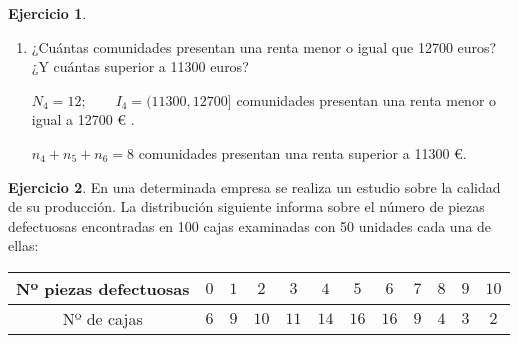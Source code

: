 \documentclass[a4paper, 12pt]{article}
\theoremstyle{definition}
\newtheorem{ej}{Ejercicio}
\begin{document}
\begin{ej}
\begin{enumerate}[label=\textit{\alph*)}]
    \item ¿Cuántas comunidades presentan una renta menor o igual que 12700 euros? ¿Y cuántas superior a 11300 euros?
    
    \(N_4 = 12 ; \qquad I_4 = (11300,12700] \)  comunidades presentan una renta menor o igual a 12700 \textup{\euro} .
    
    \(n_4 + n_5 + n_6 = 8\)  comunidades presentan una renta superior a 11300 \textup{\euro}.
    
\end{enumerate}


\end{ej}

\begin{ej}
En una determinada empresa se realiza un estudio sobre la calidad de su producción. La distribución siguiente informa sobre el número de piezas defectuosas encontradas en 100 cajas examinadas con 50 unidades cada una de ellas:

\begin{center}
    \begin{tabular}{|c|c|c|c|c|c|c|c|c|c|c|c|}
    \hline
     Nº piezas defectuosas & \(0\) & \(1\) & \(2\) & \(3\) & \(4\) & \(5\) & \(6\) & \(7\) & \(8\) & \(9\) & \(10\) \\
     \hline
     Nº de cajas & \(6\) & \(9\) & \(10\) & \(11\) & \(14\) & \(16\) & \(16\) & \(9\) & \(4\) & \(3\) & \(2\) \\
     \hline
    \end{tabular}
    
\end{center}

\begin{center}
\end{center}


\end{ej}
\end{document}
